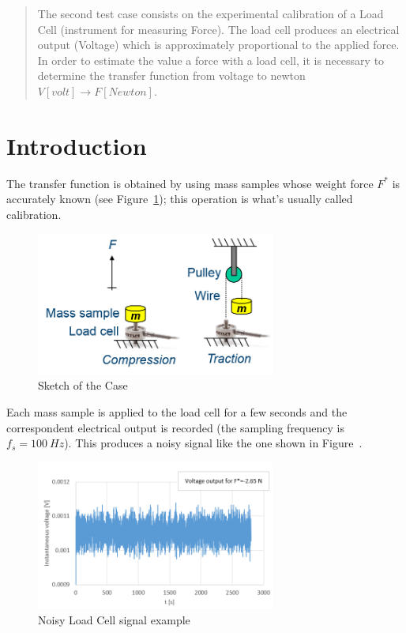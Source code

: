 \documentclass[12pt]{article}
\begin{document}
\maketitle

\begin{abstract}
        The second test case consists on the experimental calibration of a Load Cell (instrument for measuring Force). The load cell produces an electrical output (Voltage) which is approximately proportional to the applied force. In order to estimate the value a force with a load cell, it is necessary to determine the transfer function from voltage to newton \( V [volt] \rightarrow F [Newton] \). \cite{FL:02}
\end{abstract}

\section{Introduction}

        The transfer function is obtained by using mass samples whose weight force \( F^* \) is accurately known (see Figure~\ref{fig:sketch}); this operation is what's usually called calibration.

        \begin{figure}[!ht]
                \includegraphics[width=0.7\textwidth]{Sketch.png}
                \centering
                \caption{Sketch of the Case}
                \label{fig:sketch}
        \end{figure}

        Each mass sample is applied to the load cell for a few seconds and the correspondent electrical output is recorded (the sampling frequency is \( f_s=100 \: H\!z \)). This produces a noisy signal like the one shown in Figure~.

        \begin{figure}[!ht]
                \includegraphics[width=0.7\textwidth]{Noise.png}
                \centering
                \caption{Noisy Load Cell signal example}
                \label{fig:noise}
        \end{figure}
\end{document}
